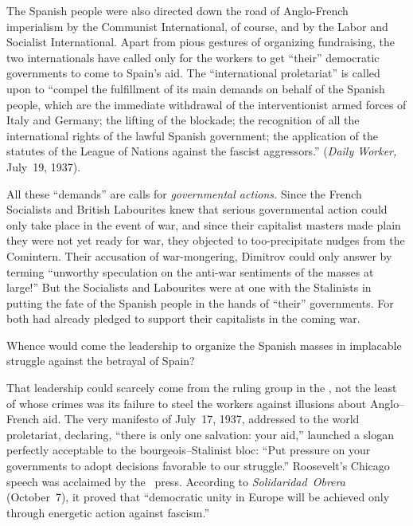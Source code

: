 The Spanish people were also directed down the road of Anglo-French imperialism by the Communist International, of course, and by the Labor and Socialist International. Apart from pious gestures of organizing fundraising, the two internationals have called only for the workers to get ``their'' democratic governments to come to Spain’s aid. The ``international proletariat'' is called upon to ``compel the fulfillment of its main demands on behalf of the Spanish people, which are the immediate withdrawal of the interventionist armed forces of Italy and Germany; the lifting of the blockade; the recognition of all the international rights of the lawful Spanish government; the application of the statutes of the League of Nations against the fascist aggressors.'' (\emph{Daily Worker,} July~19, 1937).

All these ``demands'' are calls for \emph{governmental actions.} Since the French Socialists and British Labourites knew that serious governmental action could only take place in the event of war, and since their capitalist masters made plain they were not yet ready for war, they objected to too-precipitate nudges from the Comintern. Their accusation of war-mongering, Dimitrov could only answer by terming ``unworthy speculation on the anti-war sentiments of the masses at large!'' But the Socialists and Labourites were at one with the Stalinists in putting the fate of the Spanish people in the hands of ``their'' governments. For both had already pledged to support their capitalists in the coming war.

\dinkus

\begin{sloppypar}
  Whence would come the leadership to organize the Spanish masses in implacable struggle against the betrayal of Spain?
\end{sloppypar}

\medskip

That leadership could scarcely come from the ruling group in the \CNT\kn, not the least of whose crimes was its failure to steel the workers against illusions about Anglo--French aid. The very manifesto of July~17, 1937, addressed to the world proletariat, declaring, ``there is only one salvation: your aid,'' launched a slogan perfectly acceptable to the bourgeois--Stalinist bloc: ``Put pressure on your governments to adopt decisions favorable to our struggle.'' Roosevelt’s Chicago speech was acclaimed by the \CNT\ press. According to \emph{Solidaridad~Obrera} (October~7), it proved that ``democratic unity in Europe will be achieved only through energetic action against fascism.''

